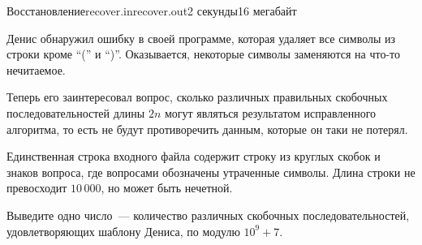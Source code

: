 \begin{problem}{Восстановление}{recover.in}{recover.out}{2 секунды}{16 мегабайт}

Денис обнаружил ошибку в своей программе, которая удаляет все символы из строки
кроме ``('' и ``)''. Оказывается, некоторые символы заменяются на что-то нечитаемое.

Теперь его заинтересовал вопрос, сколько различных правильных скобочных последовательностей длины $2n$ могут
являться результатом исправленного алгоритма, то есть не будут противоречить данным, которые он таки не потерял.

\InputFile

Единственная строка входного файла содержит строку из круглых скобок и знаков вопроса, где вопросами
обозначены утраченные символы. Длина строки не превосходит $10\,000$, но может быть нечетной.

\OutputFile

Выведите одно число~--- количество различных скобочных последовательностей, удовлетворяющих шаблону Дениса, по модулю $10^9+7$.

\Example
\begin{example}
%
\end{example}

\end{problem}
